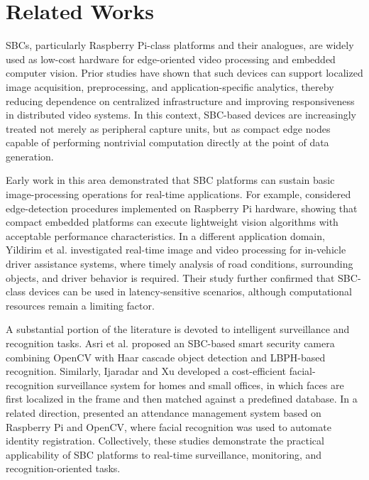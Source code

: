 \documentclass[
]{ceurart}
\begin{document}
\section{Related Works}

SBCs, particularly Raspberry Pi-class platforms and their analogues, are widely used as low-cost hardware for edge-oriented video processing and embedded computer vision. Prior studies have shown that such devices can support localized image acquisition, preprocessing, and application-specific analytics, thereby reducing dependence on centralized infrastructure and improving responsiveness in distributed video systems. In this context, SBC-based devices are increasingly treated not merely as peripheral capture units, but as compact edge nodes capable of performing nontrivial computation directly at the point of data generation.

Early work in this area demonstrated that SBC platforms can sustain basic image-processing operations for real-time applications. For example, \cite{Hiremath_Baannadabavi_Kabbin_Shirakol_2016} considered edge-detection procedures implemented on Raspberry Pi hardware, showing that compact embedded platforms can execute lightweight vision algorithms with acceptable performance characteristics. In a different application domain, Yildirim et al. \cite{Yildirim_Karaduman_Kurum_2022} investigated real-time image and video processing for in-vehicle driver assistance systems, where timely analysis of road conditions, surrounding objects, and driver behavior is required. Their study further confirmed that SBC-class devices can be used in latency-sensitive scenarios, although computational resources remain a limiting factor.

A substantial portion of the literature is devoted to intelligent surveillance and recognition tasks. Asri et al. \cite{Asri_et_al_2023} proposed an SBC-based smart security camera combining OpenCV with Haar cascade object detection and LBPH-based recognition. Similarly, Ijaradar and Xu \cite{Ijaradar_Xu_2022} developed a cost-efficient facial-recognition surveillance system for homes and small offices, in which faces are first localized in the frame and then matched against a predefined database. In a related direction, \cite{Gaddam2016FACERB} presented an attendance management system based on Raspberry Pi and OpenCV, where facial recognition was used to automate identity registration. Collectively, these studies demonstrate the practical applicability of SBC platforms to real-time surveillance, monitoring, and recognition-oriented tasks.
\end{document}
